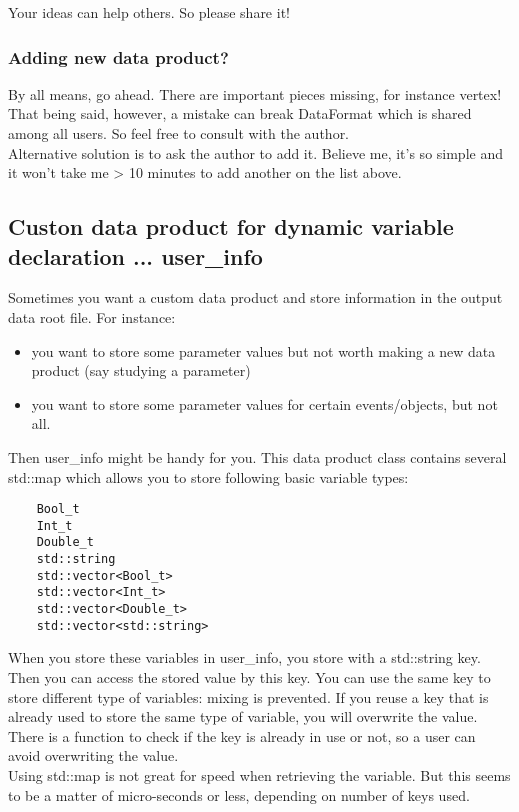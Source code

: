 Your ideas can help others. So please share it!

\subsubsection{Adding new data product?}
By all means, go ahead. There are important pieces missing, for instance vertex!
That being said, however, a mistake can break DataFormat which is shared among all users.
So feel free to consult with the author.\\

Alternative solution is to ask the author to add it. 
Believe me, it's so simple and it won't take me > 10 minutes to add another on the list above.

\subsection{Custon data product for dynamic variable declaration ... {\ttfamily user\_info}}

Sometimes you want a custom data product and store information in the output data root file.
For instance:
\begin{itemize}
\item you want to store some parameter values but not worth making a new data product (say studying a parameter)
\item you want to store some parameter values for certain events/objects, but not all.
\end{itemize}

Then {\ttfamily user\_info} might be handy for you. This data product class contains several {\ttfamily std::map} which allows you to store following basic variable types:
\begin{lstlisting}
    Bool_t
    Int_t
    Double_t
    std::string
    std::vector<Bool_t>
    std::vector<Int_t>
    std::vector<Double_t>
    std::vector<std::string>
\end{lstlisting}
When you store these variables in {\ttfamily user\_info}, you store with a {\ttfamily std::string} key. 
Then you can access the stored value by this key. 
You can use the same key to store different type of variables: mixing is prevented.
If you reuse a key that is already used to store the same type of variable, you will overwrite the value.
There is a function to check if the key is already in use or not, so a user can avoid overwriting the value.\\

Using {\ttfamily std::map} is not great for speed when retrieving the variable. 
But this seems to be a matter of micro-seconds or less, depending on number of keys used.

